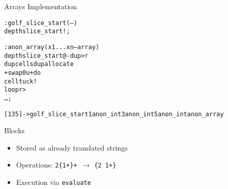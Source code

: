 \documentclass{beamer}
\begin{document}
\begin{frame}
  Arrays Implementation

  \vspace{0.5cm}

    \begin{alltt}
      \scriptsize
      : golf\_slice\_start ( -- ) \\
      \quad depth slice\_start ! ;
    \end{alltt}

    \begin{alltt}
      \scriptsize
      : anon\_array ( x1 ... xn -- array ) \\
      \quad depth slice\_start @ - dup >r \\
      \quad dup cells dup  allocate \\
      \quad + swap 0 u+do \\
      \qquad cell tuck ! \\
      \quad loop r> \\
      \quad \dots ; \\
    \end{alltt}

    \begin{alltt}
      \scriptsize
      [1 3 5] -> golf\_slice\_start 1 anon\_int 3 anon\_int  5 anon\_int anon\_array
    \end{alltt}
\end{frame}

\begin{frame}
    Blocks

    \begin{itemize}
        \item Stored as already translated strings
        \item Operations: \texttt{2\{1+\}+ }$\rightarrow$ \texttt{\{2 1+\}}
        \item Execution via \texttt{evaluate}
    \end{itemize}
\end{frame}
\end{document}
